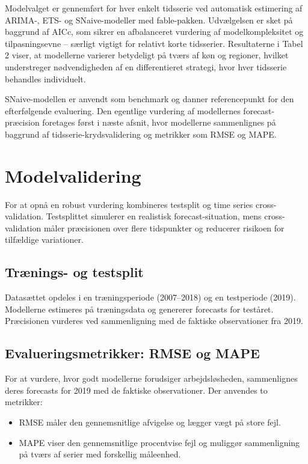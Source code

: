 \documentclass[
]{article}
\begin{document}
Modelvalget er gennemført for hver enkelt tidsserie ved automatisk
estimering af ARIMA-, ETS- og SNaive-modeller med fable-pakken.
Udvælgelsen er sket på baggrund af AICc, som sikrer en afbalanceret
vurdering af modelkompleksitet og tilpasningsevne -- særligt vigtigt for
relativt korte tidsserier. Resultaterne i Tabel 2 viser, at modellerne
varierer betydeligt på tværs af køn og regioner, hvilket understreger
nødvendigheden af en differentieret strategi, hvor hver tidsserie
behandles individuelt.

SNaive-modellen er anvendt som benchmark og danner referencepunkt for
den efterfølgende evaluering. Den egentlige vurdering af modellernes
forecast-præcision foretages først i næste afsnit, hvor modellerne
sammenlignes på baggrund af tidsserie-krydsvalidering og metrikker som
RMSE og MAPE.

\section{Modelvalidering}\label{modelvalidering}

For at opnå en robust vurdering kombineres testsplit og time series
cross-validation. Testsplittet simulerer en realistisk
forecast-situation, mens cross-validation måler præcisionen over flere
tidspunkter og reducerer risikoen for tilfældige variationer.

\subsection{Trænings- og testsplit}\label{truxe6nings--og-testsplit}

Datasættet opdeles i en træningsperiode (2007--2018) og en testperiode
(2019). Modellerne estimeres på træningsdata og genererer forecasts for
teståret. Præcisionen vurderes ved sammenligning med de faktiske
observationer fra 2019.

\subsection{Evalueringsmetrikker: RMSE og
MAPE}\label{evalueringsmetrikker-rmse-og-mape}

For at vurdere, hvor godt modellerne forudsiger arbejdsløsheden,
sammenlignes deres forecasts for 2019 med de faktiske observationer. Der
anvendes to metrikker:

\begin{itemize}
\item
  RMSE måler den gennemsnitlige afvigelse og lægger vægt på store fejl.
\item
  MAPE viser den gennemsnitlige procentvise fejl og muliggør
  sammenligning på tværs af serier med forskellig måleenhed.
\end{itemize}
\end{document}
